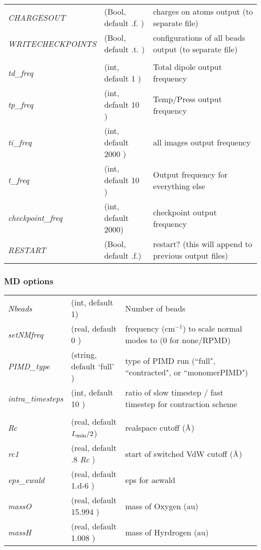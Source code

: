 \documentclass[10pt]{article}
\newcommand{\ff}[1] {  \mbox{\footnotesize{#1}}  }
\newcommand{\Ang}   {  \mbox{\normalfont\AA}     }
\begin{document}
\begin{tabular}{l l p{6cm}}
\textit{CHARGESOUT }  &(Bool, default  .f.  )&   charges on atoms output (to separate file)\\
\textit{WRITECHECKPOINTS}&(Bool, default  .t. )&  configurations of all beads output (to separate file) \\
 & & \\
\textit{td\_freq}&(int, default  1	)& 	   		 Total dipole output frequency \\
\textit{tp\_freq}&(int, default  10 	)& 	    Temp/Press output frequency\\
\textit{ti\_freq}&(int, default  2000	)& 	    all images output frequency \\
\textit{t\_freq}&(int, default   10    )&        Output frequency for everything else\\
\textit{checkpoint\_freq}&(int, default  2000)&  checkpoint output frequency\\
\textit{ RESTART} &(Bool, default  .f.)&   restart? (this will append to previous output files) \\
\end{tabular}

\subsubsection*{MD options}
\begin{tabular}{l l p{6cm}}
\textit{Nbeads}&(int, default 1)&       Number of beads \\
\textit{setNMfreq}&(real, default  0       )&      frequency (cm$^{-1}$) to scale normal modes to (0 for none/RPMD)\\
\textit{PIMD\_type}&(string, default `full'  )&     type of PIMD run (``full", ``contracted", or ``monomerPIMD") \\
\textit{intra\_timesteps}&(int, default 10  )&   ratio of slow timestep / fast timestep for contraction scheme\\
&&\\
\textit{Rc}  &(real, default $L_{\ff{min}}/2$)& 	realspace cutoff ($\Ang$)\\
\textit{rc1}  &(real, default .8 \textit{Rc}	)& start of switched VdW cutoff ($\Ang$) \\
\textit{eps\_ewald }&(real, default 1.d-6 )& eps for aewald\\
\textit{massO}&(real, default  15.994 )&   mass of Oxygen (au)\\
\textit{massH}&(real, default   1.008 )&   mass of Hyrdrogen (au)\\
\end{tabular}
\end{document}
